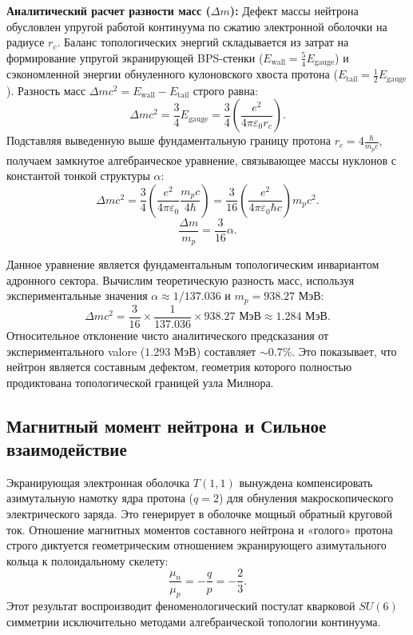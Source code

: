 \documentclass[11pt,a4paper]{article}
\begin{document}
	\textbf{Аналитический расчет разности масс ($\Delta m$):}
	Дефект массы нейтрона обусловлен упругой работой континуума по сжатию электронной оболочки на радиусе $r_c$. Баланс топологических энергий складывается из затрат на формирование упругой экранирующей BPS-стенки ($E_{\text{wall}} = \frac{5}{4} E_{\text{gauge}}$) и сэкономленной энергии обнуленного кулоновского хвоста протона ($E_{\text{tail}} = \frac{1}{2} E_{\text{gauge}}$).
	Разность масс $\Delta m c^2 = E_{\text{wall}} - E_{\text{tail}}$ строго равна:
	\begin{equation}
		\Delta m c^2 = \frac{3}{4} E_{\text{gauge}} = \frac{3}{4} \left( \frac{e^2}{4\pi\varepsilon_0 r_c} \right).
	\end{equation}
	Подставляя выведенную выше фундаментальную границу протона $r_c = 4 \frac{\hbar}{m_p c}$, получаем замкнутое алгебраическое уравнение, связывающее массы нуклонов с константой тонкой структуры $\alpha$:
	\begin{equation}
		\Delta m c^2 = \frac{3}{4} \left( \frac{e^2}{4\pi\varepsilon_0} \frac{m_p c}{4 \hbar} \right) = \frac{3}{16} \left( \frac{e^2}{4\pi\varepsilon_0 \hbar c} \right) m_p c^2.
	\end{equation}
	\begin{equation}
		\frac{\Delta m}{m_p} = \frac{3}{16} \alpha.
	\end{equation}
	
	Данное уравнение является фундаментальным топологическим инвариантом адронного сектора. Вычислим теоретическую разность масс, используя экспериментальные значения $\alpha \approx 1/137.036$ и $m_p = 938.27$ МэВ:
	\begin{equation}
		\Delta m c^2 = \frac{3}{16} \times \frac{1}{137.036} \times 938.27 \text{ МэВ} \approx \mathbf{1.284 \text{ МэВ}}.
	\end{equation}
	Относительное отклонение чисто аналитического предсказания от экспериментального valore ($1.293$ МэВ) составляет $\sim 0.7\%$. Это показывает, что нейтрон является составным дефектом, геометрия которого полностью продиктована топологической границей узла Милнора.
	
	\subsection{Магнитный момент нейтрона и Сильное взаимодействие}
	Экранирующая электронная оболочка $T(1,1)$ вынуждена компенсировать азимутальную намотку ядра протона ($q=2$) для обнуления макроскопического электрического заряда. Это генерирует в оболочке мощный обратный круговой ток. Отношение магнитных моментов составного нейтрона и «голого» протона строго диктуется геометрическим отношением экранирующего азимутального кольца к полоидальному скелету:
	\begin{equation}
		\frac{\mu_n}{\mu_p} = -\frac{q}{p} = -\frac{2}{3}.
	\end{equation}
	Этот результат воспроизводит феноменологический постулат кварковой $SU(6)$ симметрии исключительно методами алгебраической топологии континуума.
	
\end{document}
